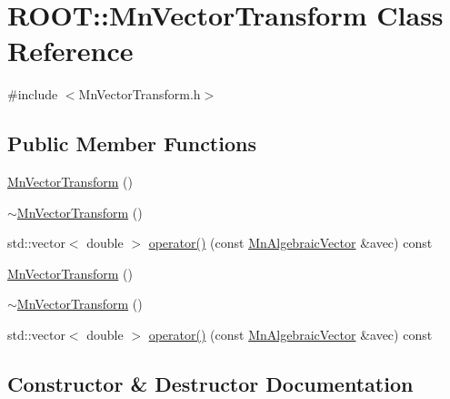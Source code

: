 \hypertarget{classROOT_1_1Minuit2_1_1MnVectorTransform}{}\section{R\+O\+OT\+:\+:Mn\+Vector\+Transform Class Reference}
\label{classROOT_1_1Minuit2_1_1MnVectorTransform}


{\ttfamily \#include $<$Mn\+Vector\+Transform.\+h$>$}

\subsection*{Public Member Functions}
\begin{DoxyCompactItemize}
\item 
\mbox{\hyperlink{classROOT_1_1Minuit2_1_1MnVectorTransform_a03da263b25ee60030130f16641096a24}{Mn\+Vector\+Transform}} ()
\item 
\mbox{\hyperlink{classROOT_1_1Minuit2_1_1MnVectorTransform_a1d3bcb72853e8346075b1cd433dd36fa}{$\sim$\+Mn\+Vector\+Transform}} ()
\item 
std\+::vector$<$ double $>$ \mbox{\hyperlink{classROOT_1_1Minuit2_1_1MnVectorTransform_a2b16b519635ee775a78d3f62663bef89}{operator()}} (const \mbox{\hyperlink{namespaceROOT_1_1Minuit2_a62ed97730a1ca8d3fbaec64a19aa11c9}{Mn\+Algebraic\+Vector}} \&avec) const
\item 
\mbox{\hyperlink{classROOT_1_1Minuit2_1_1MnVectorTransform_a03da263b25ee60030130f16641096a24}{Mn\+Vector\+Transform}} ()
\item 
\mbox{\hyperlink{classROOT_1_1Minuit2_1_1MnVectorTransform_a1d3bcb72853e8346075b1cd433dd36fa}{$\sim$\+Mn\+Vector\+Transform}} ()
\item 
std\+::vector$<$ double $>$ \mbox{\hyperlink{classROOT_1_1Minuit2_1_1MnVectorTransform_a2b16b519635ee775a78d3f62663bef89}{operator()}} (const \mbox{\hyperlink{namespaceROOT_1_1Minuit2_a62ed97730a1ca8d3fbaec64a19aa11c9}{Mn\+Algebraic\+Vector}} \&avec) const
\end{DoxyCompactItemize}


\subsection{Constructor \& Destructor Documentation}
\mbox{\label{classROOT_1_1Minuit2_1_1MnVectorTransform_a03da263b25ee60030130f16641096a24}} 
